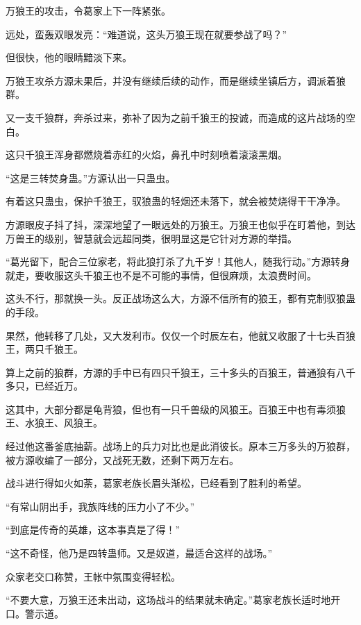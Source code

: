 
\begin{this_body}



万狼王的攻击，令葛家上下一阵紧张。

远处，蛮轰双眼发亮：“难道说，这头万狼王现在就要参战了吗？”

但很快，他的眼睛黯淡下来。

万狼王攻杀方源未果后，并没有继续后续的动作，而是继续坐镇后方，调派着狼群。

又一支千狼群，奔杀过来，弥补了因为之前千狼王的投诚，而造成的这片战场的空白。

这只千狼王浑身都燃烧着赤红的火焰，鼻孔中时刻喷着滚滚黑烟。

“这是三转焚身蛊。”方源认出一只蛊虫。

有着这只蛊虫，保护千狼王，驭狼蛊的轻烟还未落下，就会被焚烧得干干净净。

方源眼皮子抖了抖，深深地望了一眼远处的万狼王。万狼王也似乎在盯着他，到达万兽王的级别，智慧就会远超同类，很明显这是它针对方源的举措。

“葛光留下，配合三位家老，将此狼打杀了九千岁！其他人，随我行动。”方源转身就走，要收服这头千狼王也不是不可能的事情，但很麻烦，太浪费时间。

这头不行，那就换一头。反正战场这么大，方源不信所有的狼王，都有克制驭狼蛊的手段。

果然，他转移了几处，又大发利市。仅仅一个时辰左右，他就又收服了十七头百狼王，两只千狼王。

算上之前的狼群，方源的手中已有四只千狼王，三十多头的百狼王，普通狼有八千多只，已经近万。

这其中，大部分都是龟背狼，但也有一只千兽级的风狼王。百狼王中也有毒须狼王、水狼王、风狼王。

经过他这番釜底抽薪。战场上的兵力对比也是此消彼长。原本三万多头的万狼群，被方源收编了一部分，又战死无数，还剩下两万左右。

战斗进行得如火如荼，葛家老族长眉头渐松，已经看到了胜利的希望。

“有常山阴出手，我族阵线的压力小了不少。”

“到底是传奇的英雄，这本事真是了得！”

“这不奇怪，他乃是四转蛊师。又是奴道，最适合这样的战场。”

众家老交口称赞，王帐中氛围变得轻松。

“不要大意，万狼王还未出动，这场战斗的结果就未确定。”葛家老族长适时地开口。警示道。


\end{this_body}
